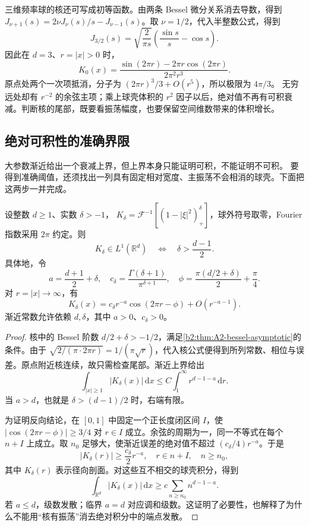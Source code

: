\ProseParagraphBreak

三维频率球的核还可写成初等函数。由两条 Bessel 微分关系消去导数，得到
\(J_{\nu+1}(s)=2\nu J_\nu(s)/s-J_{\nu-1}(s)\)。取 \(\nu=1/2\)，代入半整数公式，得到
\[
 J_{3/2}(s)=\sqrt{\frac2{\pi s}}
             \left(\frac{\sin s}s-\cos s\right).
\]
因此在 \(d=3\)、\(r=|x|>0\) 时，
\[
 K_0(x)=
 \frac{\sin(2\pi r)-2\pi r\cos(2\pi r)}{2\pi^2r^3}.
\]
原点处两个一次项抵消，分子为 \((2\pi r)^3/3+O(r^5)\)，所以极限为 \(4\pi/3\)。
无穷远处却有 \(r^{-2}\) 的余弦主项；乘上球壳体积的 \(r^2\) 因子以后，绝对值不再有可积衰减。判断核的尾部，既要看振荡幅度，也要保留空间维数带来的体积增长。

\subsection{绝对可积性的准确界限}
\label{b2:subsec:A20302}

大参数渐近给出一个衰减上界，但上界本身只能证明可积，不能证明不可积。
要得到准确阈值，还须找出一列具有固定相对宽度、主振荡不会相消的球壳。下面把这两步一并完成。

\begin{proposition}[核的可积阈值]
\label{b2:prop:A2-kernel-integrability}
设整数 \(d\geq1\)、实数 \(\delta>-1\)，
\(K_\delta=\mathcal F^{-1}[(1-|\xi|^2)_+^\delta]\)，球外符号取零，Fourier 指数采用 \(2\pi\) 约定。则
\[
 K_\delta\in L^1(\mathbb R^d)
 \quad\Longleftrightarrow\quad \delta>\frac{d-1}{2}.
\]
具体地，令
\[
 a=\frac{d+1}{2}+\delta,\quad
 c_\delta=\frac{\Gamma(\delta+1)}{\pi^{\delta+1}},\quad
 \phi=\frac{\pi(d/2+\delta)}2+\frac\pi4.
\]
对 \(r=|x|\to\infty\)，有
\[
 K_\delta(x)=c_\delta r^{-a}\cos(2\pi r-\phi)
                    +O(r^{-a-1}).
\]
渐近常数允许依赖 \(d,\delta\)，其中 \(a>0\)、\(c_\delta>0\)。
\end{proposition}
\begin{proof}
核中的 Bessel 阶数 \(d/2+\delta>-1/2\)，满足\cref{b2:thm:A2-bessel-asymptotic}的条件。由于
\(\sqrt{2/(\pi\cdot2\pi r)}=1/(\pi\sqrt r)\)，代入核公式便得到所列常数、相位与误差。原点附近核连续，故只需检查尾部。渐近上界给出
\[
 \int_{|x|\geq1}|K_\delta(x)|\,\mathrm dx
 \leq C\int_1^\infty r^{d-1-a}\,\mathrm dr.
\]
当 \(a>d\)，也就是 \(\delta>(d-1)/2\) 时，右端有限。

为证明反向结论，在 \([0,1]\) 中固定一个正长度闭区间 \(I\)，使
\(|\cos(2\pi r-\phi)|\geq3/4\) 对 \(r\in I\) 成立。余弦的周期为一，同一不等式在每个 \(n+I\) 上成立。取 \(n_0\) 足够大，使渐近误差的绝对值不超过
\((c_\delta/4)r^{-a}\)。于是
\[
 |K_\delta(r)|\geq\frac{c_\delta}{2}r^{-a},
 \quad r\in n+I,\quad n\geq n_0,
\]
其中 \(K_\delta(r)\) 表示径向剖面。对这些互不相交的球壳积分，得到
\[
 \int_{\mathbb R^d}|K_\delta(x)|\,\mathrm dx
 \geq c\sum_{n\geq n_0} n^{d-1-a}.
\]
若 \(a\leq d\)，级数发散；临界 \(a=d\) 对应调和级数。这证明了必要性，也解释了为什么不能用“核有振荡”消去绝对积分中的端点发散。
\end{proof}

